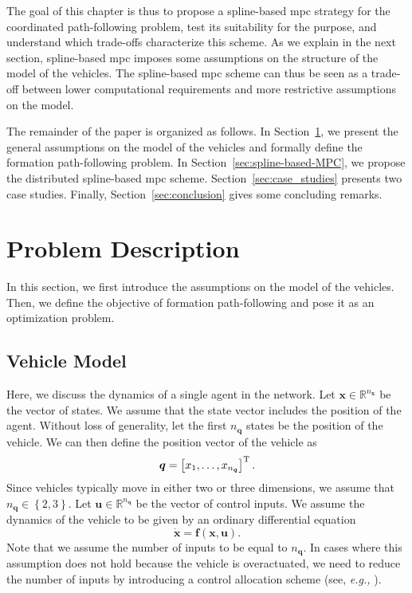 The goal of this chapter is thus to propose a spline-based \gls{mpc} strategy for the coordinated path-following problem, test its suitability for the purpose, and understand which trade-offs characterize this scheme. As we explain in the next section, spline-based \gls{mpc} imposes some assumptions on the structure of the model of the vehicles.    
The spline-based \gls{mpc} scheme can thus be seen as a trade-off between lower computational requirements and more restrictive assumptions on the model.

The remainder of the paper is organized as follows.
In Section~\ref{sec:problem-description}, we present the general assumptions on the model of the vehicles and formally define the formation path-following problem.
In Section~\ref{sec:spline-based-MPC}, we propose the distributed spline-based \gls{mpc} scheme.
Section~\ref{sec:case_studies} presents two case studies.
Finally, Section~\ref{sec:conclusion} gives some concluding remarks.

\section{Problem Description}
\label{sec:problem-description}

In this section, we first introduce the assumptions on the model of the vehicles.
Then, we define the objective of formation path-following and pose it as an optimization problem.



\subsection{Vehicle Model}
\label{ssec:vehicle-model}



Here, we discuss the dynamics of a single agent in the network. Let $\bm{x} \in \mathbb{R}^{n_{\bm{x}}}$ be the vector of states.
We assume that the state vector includes the position of the agent.
Without loss of generality, let the first $n_{\bm{q}}$ states be the position of the vehicle.
We can then define the position vector of the vehicle as
\begin{equation}
    \bm{q} = \left[x_1, \ldots, x_{n_{\bm{q}}}\right]^{\mathrm{T}}.
\end{equation}
Since vehicles typically move in either two or three dimensions, we assume that $n_{\bm{q}} \in \left\{2,3\right\}$.
Let $\bm{u} \in \mathbb{R}^{n_{\bm{q}}}$ be the vector of control inputs.
We assume the dynamics of the vehicle to be given by an ordinary differential equation
\begin{equation}
    \dot{\bm{x}} = \bm{f} \left(\bm{x}, \bm{u}\right).
\label{equ:dynamics-of-an-agent}
\end{equation}
Note that we assume the number of inputs to be equal to $n_{\bm{q}}$.
In cases where this assumption does not hold because the vehicle is overactuated, we need to reduce the number of inputs by introducing a control allocation scheme (see, \emph{e.g.,} \cite{johansen_control_2013}).


